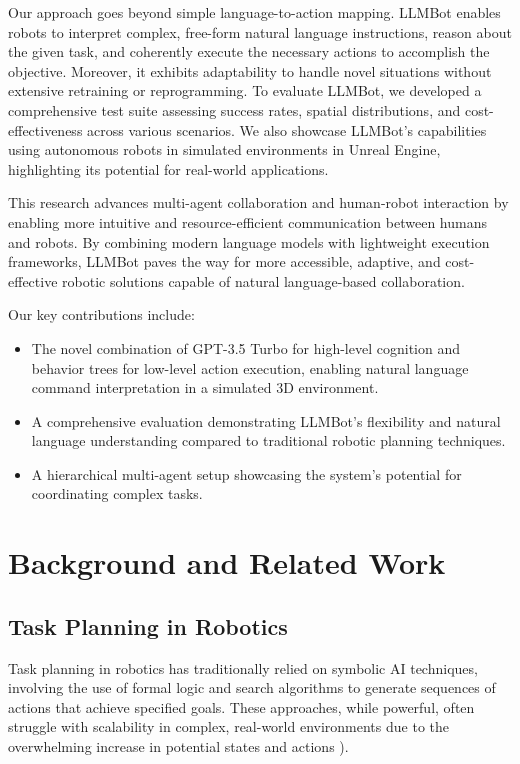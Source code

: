 \documentclass[pdflatex,sn-mathphys-num]{sn-jnl}
\theoremstyle{thmstyleone}
\theoremstyle{thmstyletwo}%
\theoremstyle{thmstylethree}%
\begin{document}
Our approach goes beyond simple language-to-action mapping. LLMBot enables robots to interpret complex, free-form natural language instructions, reason about the given task, and coherently execute the necessary actions to accomplish the objective. Moreover, it exhibits adaptability to handle novel situations without extensive retraining or reprogramming. To evaluate LLMBot, we developed a comprehensive test suite assessing success rates, spatial distributions, and cost-effectiveness across various scenarios. We also showcase LLMBot's capabilities using autonomous robots in simulated environments in Unreal Engine, highlighting its potential for real-world applications.

This research advances multi-agent collaboration and human-robot interaction by enabling more intuitive and resource-efficient communication between humans and robots. By combining modern language models with lightweight execution frameworks, LLMBot paves the way for more accessible, adaptive, and cost-effective robotic solutions capable of natural language-based collaboration.

Our key contributions include:
\begin{itemize}
    \item The novel combination of GPT-3.5 Turbo for high-level cognition and behavior trees for low-level action execution, enabling natural language command interpretation in a simulated 3D environment.
    \item A comprehensive evaluation demonstrating LLMBot's  flexibility and natural language understanding compared to traditional robotic planning techniques.
    \item A hierarchical multi-agent setup showcasing the system's potential for coordinating complex tasks.
\end{itemize}
\section{Background and Related Work}

\subsection{Task Planning in Robotics}
Task planning in robotics has traditionally relied on symbolic AI techniques, involving the use of formal logic and search algorithms to generate sequences of actions that achieve specified goals. These approaches, while powerful, often struggle with scalability in complex, real-world environments due to the overwhelming increase in potential states and actions \cite{iovino2022survey}).
\end{document}
